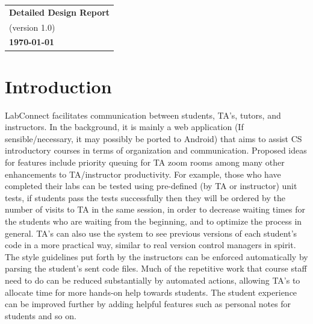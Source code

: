 \documentclass[a4paper, 12pt]{article}
\begin{document}
    \begin{table}[h!]
        \renewcommand{\arraystretch}{1.5}
        \centering
        \begin{tabular}{ |>{\centering\arraybackslash}m{15.15cm}| }
            \hline
            \Large \textbf{Detailed Design Report} \\
            \small (version 1.0) \\
            \small \textbf{\today} \\
            \hline
        \end{tabular}
    \end{table}
    
    
    \section{Introduction}
    
    
    LabConnect facilitates communication between students, TA's, tutors,
    and instructors. In the background, it is mainly a web application
    (If sensible/necessary, it may possibly be ported to Android) that aims 
    to assist CS introductory courses in terms of organization and communication. 
    Proposed ideas for features include priority queuing for TA zoom rooms among many other 
    enhancements to TA/instructor productivity. For example, those who have completed their labs 
    can be tested using pre-defined (by TA or instructor) unit tests, if students pass the 
    tests successfully then they will be ordered by the number of visits to TA 
    in the same session, in order to decrease waiting times for the students 
    who are waiting from the beginning, and to optimize the process in general. 
    TA's can also use the system to see previous versions of each student's code 
    in a more practical way, similar to real version control managers in spirit. 
    The style guidelines put forth by the instructors can be enforced automatically by parsing
    the student's sent code files. Much of the repetitive work that course
    staff need to do can be reduced substantially by automated actions,
    allowing TA's to allocate time for more hands-on help towards students.
    The student experience can be improved further by adding helpful
    features such as personal notes for students and so on.
\end{document}
